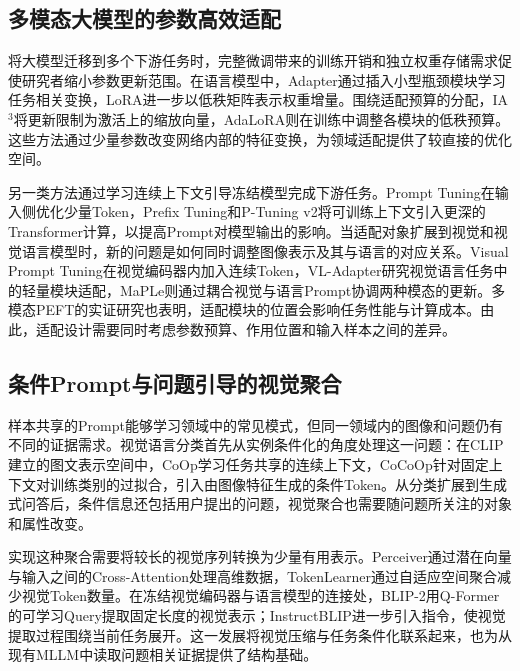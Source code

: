 \documentclass[pdflatex,sn-mathphys-num]{sn-jnl}
\begin{document}
\subsection{多模态大模型的参数高效适配}

将大模型迁移到多个下游任务时，完整微调带来的训练开销和独立权重存储需求促使研究者缩小参数更新范围。在语言模型中，Adapter通过插入小型瓶颈模块学习任务相关变换\cite{houlsby2019parameter}，LoRA进一步以低秩矩阵表示权重增量\cite{Hu2022LoRA}。围绕适配预算的分配，IA$^3$将更新限制为激活上的缩放向量\cite{Liu2022FewShotPF}，AdaLoRA则在训练中调整各模块的低秩预算\cite{Zhang2023AdaLoRAAB}。这些方法通过少量参数改变网络内部的特征变换，为领域适配提供了较直接的优化空间。

另一类方法通过学习连续上下文引导冻结模型完成下游任务。Prompt Tuning在输入侧优化少量Token\cite{lester2021power}，Prefix Tuning和P-Tuning v2将可训练上下文引入更深的Transformer计算，以提高Prompt对模型输出的影响\cite{li2021prefix,Liu2021PTuningVP}。当适配对象扩展到视觉和视觉语言模型时，新的问题是如何同时调整图像表示及其与语言的对应关系。Visual Prompt Tuning在视觉编码器内加入连续Token\cite{jia2022visual}，VL-Adapter研究视觉语言任务中的轻量模块适配\cite{sung2021vl}，MaPLe则通过耦合视觉与语言Prompt协调两种模态的更新\cite{Khattak2022MaPLeMP}。多模态PEFT的实证研究也表明，适配模块的位置会影响任务性能与计算成本\cite{zhou2024empirical}。由此，适配设计需要同时考虑参数预算、作用位置和输入样本之间的差异。

\subsection{条件Prompt与问题引导的视觉聚合}

样本共享的Prompt能够学习领域中的常见模式，但同一领域内的图像和问题仍有不同的证据需求。视觉语言分类首先从实例条件化的角度处理这一问题：在CLIP建立的图文表示空间中\cite{Radford2021LearningTV}，CoOp学习任务共享的连续上下文\cite{Zhou2021LearningTP}，CoCoOp针对固定上下文对训练类别的过拟合，引入由图像特征生成的条件Token\cite{Zhou2022ConditionalPL}。从分类扩展到生成式问答后，条件信息还包括用户提出的问题，视觉聚合也需要随问题所关注的对象和属性改变。

实现这种聚合需要将较长的视觉序列转换为少量有用表示。Perceiver通过潜在向量与输入之间的Cross-Attention处理高维数据\cite{Jaegle2021PerceiverGP}，TokenLearner通过自适应空间聚合减少视觉Token数量\cite{Ryoo2021TokenLearnerWC}。在冻结视觉编码器与语言模型的连接处，BLIP-2用Q-Former的可学习Query提取固定长度的视觉表示\cite{li2023blip}；InstructBLIP进一步引入指令，使视觉提取过程围绕当前任务展开\cite{dai2023instructblip}。这一发展将视觉压缩与任务条件化联系起来，也为从现有MLLM中读取问题相关证据提供了结构基础。
\end{document}
